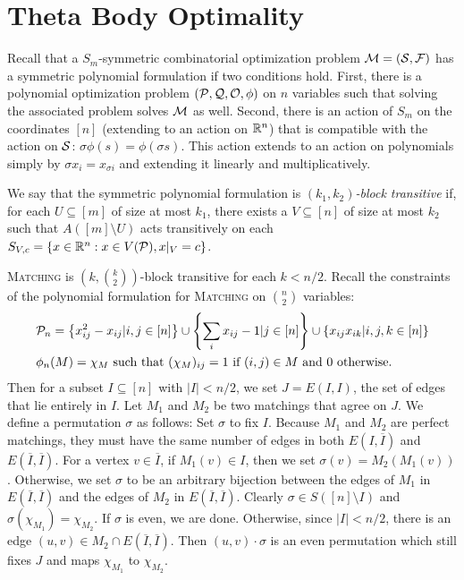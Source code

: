 \section{Theta Body Optimality}
Recall that a $S_m$-symmetric combinatorial optimization problem $\mathcal M = (\mathcal S, \mathcal F)$ has a symmetric polynomial formulation if two conditions hold. First, there is a polynomial optimization problem $(\mathcal P, \mathcal Q, \mathcal O, \phi)$ on $n$ variables such that solving the associated problem solves $\mathcal M$ as well. Second, there is an action of $S_m$ on the coordinates $[n]$ (extending to an action on $\mathbb R^n$) that is compatible with the action on $\mathcal S$: $\sigma\phi(s) = \phi(\sigma s)$. This action extends to an action on polynomials simply by $\sigma x_i = x_{\sigma i}$ and extending it linearly and multiplicatively. 
\begin{definition}
We say that the symmetric polynomial formulation is \emph{$(k_1,k_2)$-block transitive} if, for each $U \subseteq [m]$ of size at most $k_1$, there exists a $V \subseteq [n]$ of size at most $k_2$ such that $A([m] \setminus U)$ acts transitively on each $S_{V,c} = \{x \in \mathbb R^n: x \in V(\mathcal P), x|_V = c\}$.
\end{definition}
\begin{example}\label{ex:matching-blocktransitive}
\textsc{Matching} is $\left(k,\binom{k}{2}\right)$-block transitive for each $k < n/2$. Recall the constraints of the polynomial formulation for \textsc{Matching} on $\binom{n}{2}$ variables:
\begin{align*}
&\mathcal P_n = \left\{x_{ij}^2 - x_{ij} | i,j \in [n]\right\} \cup \left\{\sum_i x_{ij} - 1 | j \in [n]\right\} \cup \left\{x_{ij}x_{ik} | i,j,k \in [n]\right\} \\
&\phi_n(M) = \chi_M \text{ such that } (\chi_M)_{ij} = 1 \text{ if $(i,j) \in M$ and $0$ otherwise.}
\end{align*}
Then for a subset $I \subseteq [n]$ with $|I| < n/2$, we set $J = E(I,I)$, the set of edges that lie entirely in $I$. Let $M_1$ and $M_2$ be two matchings that agree on $J$. We define a permutation $\sigma$ as follows: Set $\sigma$ to fix $I$. Because $M_1$ and $M_2$ are perfect matchings, they must have the same number of edges in both $E(I, \overline{I})$ and $E(\overline{I},\overline{I})$. For a vertex $v \in \overline{I}$, if $M_1(v) \in I$, then we set $\sigma(v) = M_2(M_1(v))$. Otherwise, we set $\sigma$ to be an arbitrary bijection between the edges of $M_1$ in $E(\overline{I},\overline{I})$ and the edges of $M_2$ in $E(\overline{I},\overline{I})$. Clearly $\sigma \in S([n]\setminus I)$ and $\sigma(\chi_{M_1}) = \chi_{M_2}$. If $\sigma$ is even, we are done. Otherwise, since $|I| < n/2$, there is an edge $(u,v) \in M_2 \cap E(\overline{I},\overline{I})$. Then $(u,v) \cdot \sigma$ is an even permutation which still fixes $J$ and maps $\chi_{M_1}$ to $\chi_{M_2}$.
\end{example}

